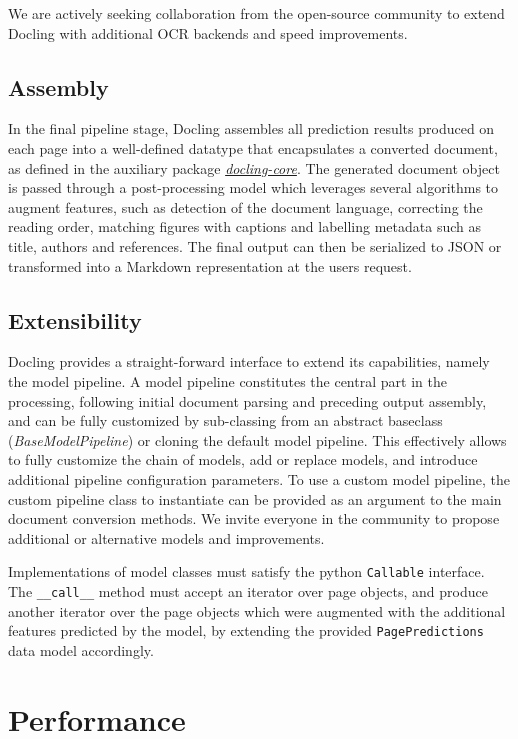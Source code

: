\documentclass{article}
\begin{document}
We are actively seeking collaboration from the open-source community to extend Docling with additional OCR backends and speed improvements.

\subsection{Assembly}

In the final pipeline stage, Docling assembles all prediction results produced on each page into a well-defined datatype that encapsulates a converted document, as defined in the auxiliary package \textit{\href{https://github.com/DS4SD/docling-core}{docling-core}}. The generated document object is passed through a post-processing model which leverages several algorithms to augment features, such as detection of the document language, correcting the reading order, matching figures with captions and labelling metadata such as title, authors and references.
The final output can then be serialized to JSON or transformed into a Markdown representation at the users request.

\subsection{Extensibility}

Docling provides a straight-forward interface to extend its capabilities, namely the model pipeline. A model pipeline constitutes the central part in the processing, following initial document parsing and preceding output assembly, and can be fully customized by sub-classing from an abstract baseclass (\textit{BaseModelPipeline}) or cloning the default model pipeline. This effectively allows to fully customize the chain of models, add or replace models, and introduce additional pipeline configuration parameters. To use a custom model pipeline, the custom pipeline class to instantiate can be provided as an argument to the main document conversion methods. We invite everyone in the community to propose additional or alternative models and improvements.

Implementations of model classes must satisfy the python \lstinline{Callable} interface. The \lstinline{__call__} method must accept an iterator over page objects, and produce another iterator over the page objects which were augmented with the additional features predicted by the model, by extending the provided \lstinline{PagePredictions} data model accordingly. 


\section{Performance}
\end{document}
